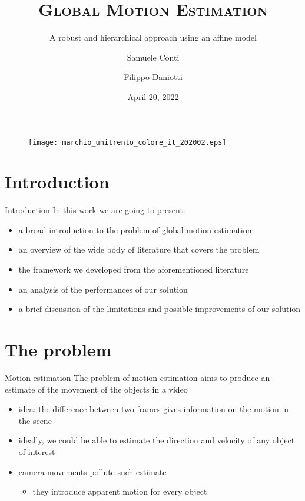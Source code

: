 \documentclass[aspectratio=1610,xcolor=dvipsnames]{beamer}
\author[Conti \and Daniotti]{Samuele Conti \and Filippo Daniotti}
\title[Global Motion Estimation]{\textsc{Global Motion Estimation}}
\subtitle{A robust and hierarchical approach using an affine model}
\institute[DISI - University of Trento]{Department of Information Engineering\\and Computer Science}
\date{April 20, 2022}
\begin{document}
\begin{frame}
    \titlepage
    \begin{figure}[H]
        \begin{center}
            \texttt{[image: marchio\_unitrento\_colore\_it\_202002.eps]}
        \end{center}
    \end{figure}
\end{frame}

\begin{frame}
    \tableofcontents[sectionstyle=show,subsectionstyle=show/shaded/hide,subsubsectionstyle=show/shaded/hide]
\end{frame}

\section{Introduction}
\begin{frame}{Introduction}
    In this work we are going to present:
    \begin{itemize}
        \item a broad introduction to the problem of global motion estimation
        \item an overview of the wide body of literature that covers the problem
        \item the framework we developed from the aforementioned literature
        \item an analysis of the performances of our solution
        \item a brief discussion of the limitations and possible improvements of our solution
    \end{itemize}
\end{frame}

\section{The problem}
\begin{frame}{Motion estimation}
    The problem of motion estimation aims to produce an estimate of the movement of the objects in a video
    \bigskip
    \begin{itemize}
        \item idea: the difference between two frames gives information on the motion in the scene
        \item ideally, we could be able to estimate the direction and velocity of any object of interest
        \item camera movements pollute such estimate
        \begin{itemize}
            \item they introduce apparent motion for every object
        \end{itemize} 
    \end{itemize}
\end{frame}
\end{document}
